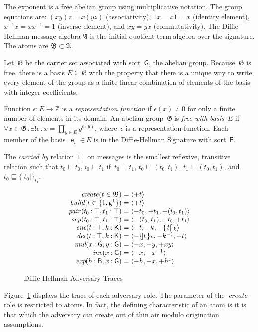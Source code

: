 \documentclass[12pt]{article}
\newcommand{\cn}[1]{\ensuremath{\operatorname{\mathsf{#1}}}}
\newcommand{\fn}[1]{\ensuremath{\operatorname{\mathit{#1}}}}
\newcommand{\srt}[1]{\ensuremath{\mathsf{#1}}}
\newcommand{\typ}{\mathbin:}
\newcommand{\seq}[1]{\ensuremath{\langle#1\rangle}}
\newcommand{\enc}[2]{\ensuremath{\{\!|#1|\!\}_{#2}}}
\newcommand{\inv}[1]{{#1}^{-1}}
\newcommand{\inbnd}{\mathord -}
\newcommand{\outbnd}{\mathord +}
\newcommand{\zed}{\ensuremath{\mathbb{Z}}}
\newcommand{\all}[1]{\forall#1\mathpunct.}
\newcommand{\some}[1]{\exists#1\mathpunct.}
\newcommand{\alg}[1]{\ensuremath{\mathfrak#1}}
\begin{document}
The exponent is a free abelian group using multiplicative notation.
The group equations are: $(xy)z=x(yz)$ (associativity), $1x=x1=x$
(identity element), $\inv{x}x=x\inv{x}=1$ (inverse element), and
$xy=yx$ (commutativity).  The Diffie-Hellman message algebra \alg{A}
is the initial quotient term algebra over the signature.
The atoms are $\alg{B}\subset\alg{A}$.

Let~\alg{G} be the carrier set associated with sort~\srt{G}, the
abelian group.  Because~\alg{G} is free, there is a basis
$E\subseteq\alg{G}$ with the property that there is a unique way to
write every element of the group as a finite linear combination of
elements of the basis with integer coefficients.

Function $\epsilon\typ E\to\zed$ is a \emph{representation function}
if $\epsilon(x)\neq 0$ for only a finite number of elements in its
domain.  An abelian group~\alg{G} is \emph{free with basis}~$E$ if
$\all{x\in\alg{G}}\some{!\epsilon}x=\prod_{y\in E}y^{\epsilon(y)}$,
where~$\epsilon$ is a representation function.  Each member of the
basis~$\cn{e}_i\in E$ is in the Diffie-Hellman Signature with
sort~\srt{E}.

The \emph{carried by} relation $\sqsubseteq$ on messages is the
smallest reflexive, transitive relation such that $t_0\sqsubseteq
t_0$, $t_0\sqsubseteq t_1$ if~$t_0=t_1$, $t_0\sqsubseteq (t_0, t_1)$,
$t_1\sqsubseteq (t_0, t_1)$, and $t_0\sqsubseteq\enc{t_0}{t_1}$.

\begin{figure}
$$\begin{array}{r@{{}={}}l}
\fn{create}(t\in\alg{B})&\seq{\outbnd t}\\
\fn{build}(t\in\{1,\cn{g}^1\})&\seq{\outbnd t}\\
\fn{pair}(t_0\typ\top, t_1\typ\top)&
\seq{\inbnd t_0,\inbnd t_1,\outbnd (t_0,t_1)}\\
\fn{sep}(t_0\typ\top, t_1\typ\top)&
\seq{\inbnd (t_0, t_1),\outbnd t_0,\outbnd t_1}\\
\fn{enc}(t\typ\top, k\typ\srt{K})&
\seq{\inbnd t,\inbnd k,\outbnd \enc{t}{k}}\\
\fn{dec}(t\typ\top, k\typ\srt{K})&
\seq{\inbnd \enc{t}{k},\inbnd\inv{k},\outbnd t}\\
\fn{mul}(x\typ\srt{G}, y\typ\srt{G})&
\seq{\inbnd x,\inbnd y,\outbnd xy}\\
\fn{inv}(x\typ\srt{G})&
\seq{\inbnd x,\outbnd \inv{x}}\\
\fn{exp}(h\typ\srt{B}, x\typ\srt{G})&
\seq{\inbnd h,\inbnd x,\outbnd h^x}
\end{array}$$
\caption{Diffie-Hellman Adversary Traces}\label{seq:dh adversary}
\end{figure}

Figure~\ref{seq:dh adversary} displays the trace of each adversary
role.  The parameter of the \fn{create} role is restricted to atoms.
In fact, the defining characteristic of an atom is it is that which
the adversary can create out of thin air modulo origination
assumptions.

\iffalse
The discrete logarithm problem is to find~$x$ given $\cn{g}^x$.  The
computational Diffie-Hellman problem is to find~$\cn{g}^{xy}$
given~$\cn{g}^x$ and~$\cn{g}^y$.  (\emph{Why is this here?})
\fi
\end{document}
